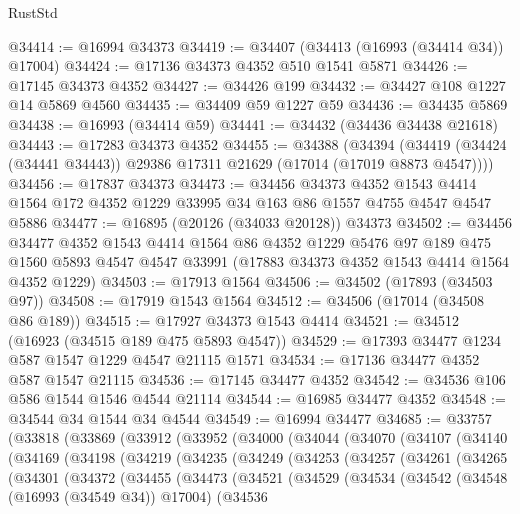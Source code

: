 \begin{lexlean}{RustStd}
\begin{coremodule}
{\begin{coremodule}
{{{{{{{{{{{{{{{{{{{{{{{{{{{{{{{{{{{{{{{{{{{{{{{{{{{{{{{@34414 := @16994 @34373
@34419 := @34407 (@34413 (@16993 (@34414 @34)) @17004)
@34424 := @17136 @34373 @4352 @510 @1541 @5871
@34426 := @17145 @34373 @4352
@34427 := @34426 @199
@34432 := @34427 @108 @1227 @14 @5869 @4560
@34435 := @34409 @59 @1227 @59
@34436 := @34435 @5869
@34438 := @16993 (@34414 @59)
@34441 := @34432 (@34436 @34438 @21618)
@34443 := @17283 @34373 @4352
@34455 := @34388
    (@34394 (@34419 (@34424 (@34441 @34443)) @29386 @17311 @21629 (@17014 (@17019 @8873 @4547))))
@34456 := @17837 @34373
@34473 := @34456
    @34373
    @4352
    @1543
    @4414
    @1564
    @172
    @4352
    @1229
    @33995
    @34
    @163
    @86
    @1557
    @4755
    @4547
    @4547
    @5886
@34477 := @16895 (@20126 (@34033 @20128)) @34373
@34502 := @34456
    @34477
    @4352
    @1543
    @4414
    @1564
    @86
    @4352
    @1229
    @5476
    @97
    @189
    @475
    @1560
    @5893
    @4547
    @4547
    @33991
    (@17883 @34373 @4352 @1543 @4414 @1564 @4352 @1229)
@34503 := @17913 @1564
@34506 := @34502 (@17893 (@34503 @97))
@34508 := @17919 @1543 @1564
@34512 := @34506 (@17014 (@34508 @86 @189))
@34515 := @17927 @34373 @1543 @4414
@34521 := @34512 (@16923 (@34515 @189 @475 @5893 @4547))
@34529 := @17393 @34477 @1234 @587 @1547 @1229 @4547 @21115 @1571
@34534 := @17136 @34477 @4352 @587 @1547 @21115
@34536 := @17145 @34477 @4352
@34542 := @34536 @106 @586 @1544 @1546 @4544 @21114
@34544 := @16985 @34477 @4352
@34548 := @34544 @34 @1544 @34 @4544
@34549 := @16994 @34477
@34685 := @33757
    (@33818
      (@33869
        (@33912
          (@33952
            (@34000
              (@34044
                (@34070
                  (@34107
                    (@34140
                      (@34169
                        (@34198
                          (@34219
                            (@34235
                              (@34249
                                (@34253
                                  (@34257
                                    (@34261
                                      (@34265
                                        (@34301
                                          (@34372
                                            (@34455
                                              (@34473
                                                (@34521
                                                  (@34529
                                                    (@34534
                                                      (@34542
                                                        (@34548 (@16993 (@34549 @34)) @17004)
                                                        (@34536
}}}}}}}}}}}}}}}}}}}}}}}}}}}}}}}}}}}}}}}}}}}}}}}}}}}}}}}
\end{coremodule}}
\end{coremodule}
\end{lexlean}
